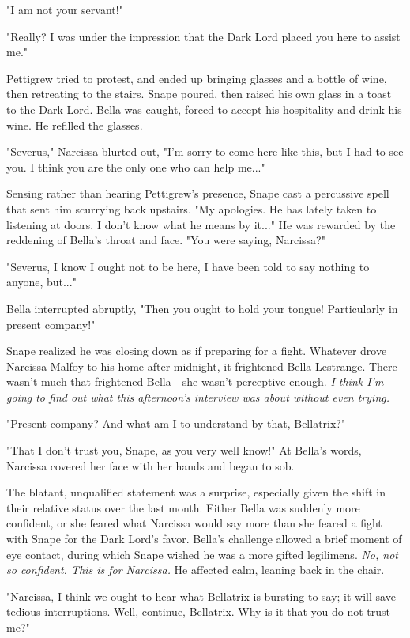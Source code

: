 \documentclass[a4paper,11pt]{article}
\begin{document}
"I am not your servant!"

"Really? I was under the impression that the Dark Lord placed you here to assist me."

Pettigrew tried to protest, and ended up bringing glasses and a bottle of wine, then retreating to the stairs. Snape poured, then raised his own glass in a toast to the Dark Lord. Bella was caught, forced to accept his hospitality and drink his wine. He refilled the glasses.

"Severus," Narcissa blurted out, "I'm sorry to come here like this, but I had to see you. I think you are the only one who can help me..."

Sensing rather than hearing Pettigrew's presence, Snape cast a percussive spell that sent him scurrying back upstairs. "My apologies. He has lately taken to listening at doors. I don't know what he means by it..." He was rewarded by the reddening of Bella's throat and face. "You were saying, Narcissa?"

"Severus, I know I ought not to be here, I have been told to say nothing to anyone, but..."

Bella interrupted abruptly, "Then you ought to hold your tongue! Particularly in present company!"

Snape realized he was closing down as if preparing for a fight. Whatever drove Narcissa Malfoy to his home after midnight, it frightened Bella Lestrange. There wasn't much that frightened Bella - she wasn't perceptive enough. \emph{I think I'm going to find out what this afternoon's interview was about without even trying.}

"Present company? And what am I to understand by that, Bellatrix?"

"That I don't trust you, Snape, as you very well know!" At Bella's words, Narcissa covered her face with her hands and began to sob.

The blatant, unqualified statement was a surprise, especially given the shift in their relative status over the last month. Either Bella was suddenly more confident, or she feared what Narcissa would say more than she feared a fight with Snape for the Dark Lord's favor. Bella's challenge allowed a brief moment of eye contact, during which Snape wished he was a more gifted legilimens. \emph{No, not so confident. This is for Narcissa.} He affected calm, leaning back in the chair.

"Narcissa, I think we ought to hear what Bellatrix is bursting to say; it will save tedious interruptions. Well, continue, Bellatrix. Why is it that you do not trust me?"
\end{document}
